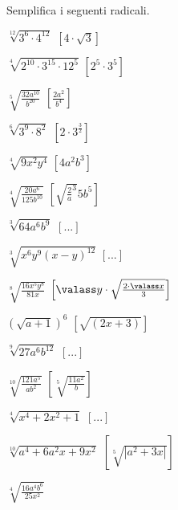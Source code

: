 \begin{esercizio}[\Ast]
 \label{ese:2.27}
Semplifica i seguenti radicali.
\vspace{-.5em}
 \begin{multicols}{2}
 \begin{enumeratea}
 \item $\sqrt[12]{3^6\cdot 4^{12}}$
  \hfill $\left[4\cdot \sqrt 3\right]$
 \item $\sqrt[4]{2^{10}\cdot 3^{15}\cdot 12^5}$
  \hfill $\left[2^5 \cdot 3^5\right]$
 \item $\sqrt[5]{\frac{32a^{10}}{b^{20}}}$
  \hfill $\left[\frac{2 a^2}{b^4}\right]$
 \item $\sqrt[6]{3^9\cdot 8^2}$
  \hfill $\left[2 \cdot 3^\frac{3}{2}\right]$
 \item $\sqrt[4]{9x^2y^4}$
  \hfill $\left[4a^2b^3\right]$
 \item $\sqrt[4]{\frac{20a^6}{125b^{10}}}$
  \hfill $\left[\sqrt{\frac2 a^3}{5 b^5}\right]$
 \item $\sqrt[3]{64a^6b^9}$
  \hfill $\left[...\right]$
 \item $\sqrt[3]{x^6y^9(x-y)^{12}}$
  \hfill $\left[...\right]$
 \item $\sqrt[8]{\frac{16x^5y^8}{81x}}$
  \hfill $\left[\valass y \cdot \sqrt{\frac{2\cdot \valass x} 3}\right]$
 \item $\left(\sqrt{a+1}\right)^6$
  \hfill $\left[\sqrt{(2x+3)}\right]$
 \item $\sqrt[9]{27a^6b^{12}}$
  \hfill $\left[...\right]$
 \item $\sqrt[10]{\frac{121a^5}{ab^2}}$
  \hfill $\left[\sqrt[5]{\frac{11a^2}{b}}\right]$
 \item $\sqrt[4]{x^4+2x^2+1}$
  \hfill $\left[...\right]$
 \item $\sqrt[10]{a^4+6a^2x+9x^2}$
  \hfill $\left[\sqrt[5]{\left|a^2+3x\right|}\right]$
 \item $\sqrt[4]{\frac{16a^4b^6}{25x^2}}$

\end{enumeratea}
\end{multicols}
\end{esercizio}
